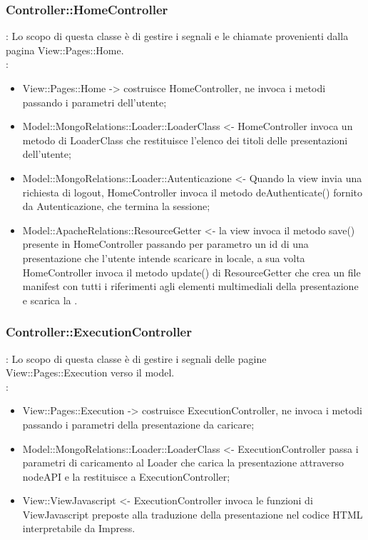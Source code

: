 {	\subsubsection{Controller::\-HomeController}{
				\textbf{\tipo}: Lo scopo di questa classe è di gestire i segnali e le chiamate provenienti dalla pagina View::\-Pages::\-Home.\\	
				\textbf{\relaz}:
				\begin{itemize}
					\item View::\-Pages::\-Home -> costruisce HomeController, ne invoca i metodi passando i parametri dell’utente;
					\item Model::\-MongoRelations::\-Loader::\-LoaderClass <- HomeController invoca un metodo di LoaderClass che restituisce l’elenco dei titoli delle presentazioni dell’utente;
					\item Model::\-MongoRelations::\-Loader::\-Autenticazione <- Quando la view invia una richiesta di logout, HomeController invoca il metodo deAuthenticate() fornito da Autenticazione, che termina la sessione;
					\item Model::\-ApacheRelations::\-ResourceGetter <- la view invoca il metodo save() presente in HomeController passando per parametro un id di una presentazione che l'utente intende scaricare in locale, a sua volta HomeController invoca il metodo update() di ResourceGetter che crea un file manifest con tutti i riferimenti agli elementi multimediali della presentazione e scarica la .
				\end{itemize} 
			}
		\subsubsection{Controller::\-ExecutionController}{
				\textbf{\tipo}: Lo scopo di questa classe è di gestire i segnali delle pagine View::\-Pages::\-Execution verso il model.\\	
				\textbf{\relaz}:
					\begin{itemize}
						\item View::\-Pages::\-Execution -> costruisce ExecutionController, ne invoca i metodi passando i parametri della presentazione da caricare;
						\item Model::\-MongoRelations::\-Loader::\-LoaderClass <- ExecutionController passa i parametri di caricamento al Loader che carica la presentazione attraverso nodeAPI e la restituisce a ExecutionController;
						\item View::\-ViewJavascript <- ExecutionController invoca le funzioni di ViewJavascript preposte alla traduzione della presentazione nel codice HTML interpretabile da Impress.
					\end{itemize}
		}
		
}
